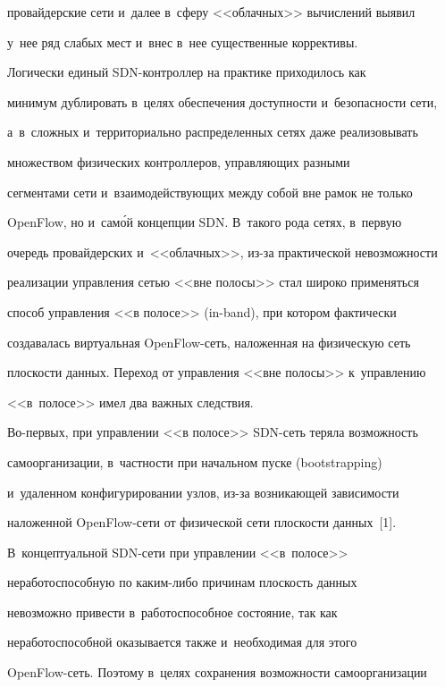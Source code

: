 провайдерские сети и~далее в~сферу <<облачных>> вычислений выявил 


у~нее ряд слабых мест и~внес в~нее существенные коррективы.


    


    Логически единый SDN-конт\-рол\-лер на практике приходилось как 


минимум дублировать в~целях обеспечения до\-ступ\-ности и~безопас\-ности сети, 


а~в~слож\-ных и~территориально распределенных сетях даже реализовывать 


множеством физических контроллеров, управ\-ля\-ющих разными 


сегментами сети и~вза\-и\-мо\-дей\-ст\-ву\-ющих меж\-ду собой вне рамок не только 


OpenFlow, но и~сам\'{о}й концепции SDN. В~такого рода сетях, в~первую 


очередь провайдерских и~<<облачных>>, из-за практической невозможности 


реализации управления сетью <<вне полосы>> стал широко применяться 


способ управ\-ле\-ния <<в полосе>> (in-band), при котором фактически 


создавалась виртуальная OpenFlow-сеть, наложенная на физическую сеть 


плос\-кости данных. Переход от управ\-ле\-ния <<вне полосы>> к~управ\-ле\-нию 


<<в~полосе>> имел два важ\-ных следствия.


    


    Во-первых, при управлении <<в полосе>> SDN-сеть теряла возможность 


самоорганизации, в~част\-ности при начальном пуске (bootstrapping) 


и~удаленном конфигурировании узлов, из-за возникающей за\-ви\-си\-мости 


наложенной OpenFlow-се\-ти от физической сети плоскости данных~[1]. 


В~концептуальной SDN-се\-ти при управ\-ле\-нии <<в~полосе>> 


неработоспособную по ка\-ким-ли\-бо причинам плос\-кость данных 


невозможно привести в~работоспособное состояние, так как 


неработоспособной оказывается также и~необходимая для этого  


OpenFlow-сеть. Поэтому в~целях сохранения воз\-мож\-ности самоорганизации 


